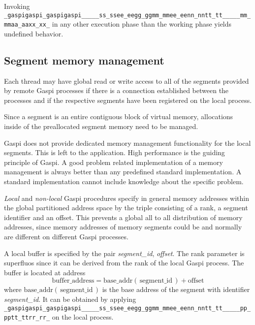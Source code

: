 \documentclass{article}
\makeatletter
\newlength{\lw}\setlength{\lw}{0.4pt}
\newlength{\st}\setlength{\st}{0pt}
\newcommand{\zerowsep}{\hskip 0pt plus 0.1pt minus 0.1pt}
\newcommand{\ZSEP}[1]{\ifx#1\@@@EOZ@@@\let\next\relax\else\ifx#1\_#1\zerowsep\else#1\fi\let\next\ZSEP\fi\next}
\newcommand{\zsep}[1]{\ZSEP{}#1\@@@EOZ@@@}
\newcommand{\gaspiprefix}{gaspi}
\newcommand{\GASPI}{{\sc Gaspi}}
\newcommand{\function}[1]{{\tt #1}}
\newcommand{\parameter}[1]{{\it #1}}
\newcommand{\gaspifunction}[1]{\function{\protect\zsep{\gaspiprefix\_#1}}}
\newcommand{\gaspisemantic}[1]{{\emph{#1}}}
\makeatother
\begin{document}
Invoking
\gaspifunction{segment\_max} in any other execution phase than the working phase
yields undefined behavior.

\subsection{Segment memory management}

Each thread may have global read or write access to all of
the segments provided by remote \GASPI{} processes if there
is a connection established between the processes and if the
respective segments have been registered on the local process.

Since a segment is an entire contiguous block of virtual memory,
allocations inside of the preallocated segment memory need to be
managed.

\GASPI{} does not provide dedicated memory management functionality
for the local segments. This is left to the application.
High performance is the guiding principle of \GASPI{}.
A good problem related implementation of a memory management is always better
than any predefined standard implementation. A standard implementation cannot
include knowledge about the specific problem.

\gaspisemantic{Local} and \gaspisemantic{non-local} \GASPI{} procedures
specify in general memory addresses within the global partitioned address space by
the triple consisting of a rank, a segment identifier and
an offset.  This prevents a global all to all distribution of memory
addresses, since memory addresses of memory segments could be and
normally are different on different \GASPI{} processes.

A local buffer is specified by the pair \parameter{segment\_id}, \parameter{offset}.
The rank parameter is superfluos since it can be derived from the rank of the local \GASPI{} process.
The buffer  is located at address
\begin{equation}
\mbox{buffer\_address} = \mbox{base\_addr}\left(\, \mbox{segment\_id} \,\right) + \mbox{offset} \nonumber
\end{equation}
where $\mbox{base\_addr}(\, \mbox{segment\_id} \,)$ is the base address of the segment with identifier
\parameter{segment\_id}.
It can be obtained by applying \gaspifunction{segment\_ptr} on the local process.
\end{document}
